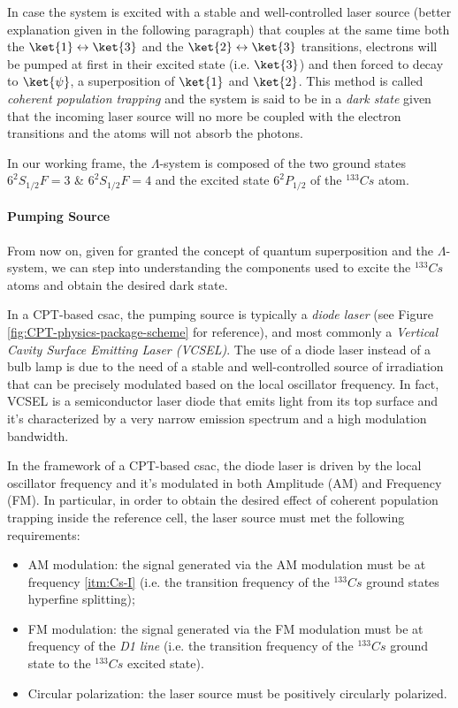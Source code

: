 In case the system is excited with a stable and well-controlled laser source (better explanation given in the following paragraph) that couples at the same time both the $\ket{1} \leftrightarrow \ket{3}$ and the $\ket{2} \leftrightarrow \ket{3}$ transitions, electrons will be pumped at first in their excited state (i.e. $\ket{3}$) and then forced to decay to $\ket{\psi}$, a superposition of $\ket{1}$ and $\ket{2}$.
This method is called \textit{coherent population trapping} and the system is said to be in a \textit{dark state} given that the incoming laser source will no more be coupled with the electron transitions and the atoms will not absorb the photons.

In our working frame, the $\Lambda$-system is composed of the two ground states $6^2S_{1/2} F=3$ \& $6^2S_{1/2} F=4$ and the excited state $6^2P_{1/2}$ of the $^{133}Cs$ atom.


\paragraph{Pumping Source}

From now on, given for granted the concept of quantum superposition and the $\Lambda$-system, we can step into understanding the components used to excite the $^{133}Cs$ atoms and obtain the desired dark state.

In a CPT-based \acrshort{csac}, the pumping source is typically a \textit{diode laser} (see Figure \ref{fig:CPT-physics-package-scheme} for reference), and most commonly a \textit{Vertical Cavity Surface Emitting Laser (VCSEL)}.
The use of a diode laser instead of a bulb lamp is due to the need of a stable and well-controlled source of irradiation that can be precisely modulated based on the local oscillator frequency.
In fact, VCSEL is a semiconductor laser diode that emits light from its top surface and it's characterized by a very narrow emission spectrum and a high modulation bandwidth.

In the framework of a CPT-based \acrshort{csac}, the diode laser is driven by the local oscillator frequency and it's modulated in both Amplitude (AM) and Frequency (FM).
In particular, in order to obtain the desired effect of coherent population trapping inside the reference cell, the laser source must met the following requirements:

\begin{itemize}
    \item AM modulation: the signal generated via the AM modulation must be at frequency \ref{itm:Cs-I} (i.e. the transition frequency of the $^{133}Cs$ ground states hyperfine splitting);
    \item FM modulation: the signal generated via the FM modulation must be at frequency of the \textit{D1 line} (i.e. the transition frequency of the $^{133}Cs$ ground state to the $^{133}Cs$ excited state).
    \item Circular polarization: the laser source must be positively circularly polarized.
\end{itemize}

